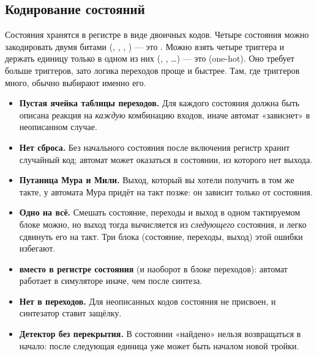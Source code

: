 \subsection{Кодирование состояний}

Состояния хранятся в регистре в виде двоичных кодов. Четыре состояния можно
закодировать двумя битами (, , , ) ---
это . Можно взять четыре триггера и держать единицу
только в одном из них (, , \ldots) --- это
 (one-hot). Оно требует больше триггеров, зато
логика переходов проще и быстрее. Там, где триггеров много, обычно выбирают
именно его. 

\begin{warnbox}
\begin{itemize}
  \item \textbf{Пустая ячейка таблицы переходов.} Для каждого состояния должна
        быть описана реакция на \emph{каждую} комбинацию входов, иначе
        автомат «зависнет» в неописанном случае.
  \item \textbf{Нет сброса.} Без начального состояния после включения
        регистр хранит случайный код; автомат может оказаться в состоянии, из
        которого нет выхода.
  \item \textbf{Путаница Мура и Мили.} Выход, который вы хотели получить в том
        же такте, у автомата Мура придёт на такт позже: он зависит только от
        состояния.
  \item \textbf{Одно  на всё.} Смешать состояние, переходы и
        выход в одном тактируемом блоке можно, но выход тогда вычисляется
        из \emph{следующего} состояния, и легко сдвинуть его на такт. Три
        блока (состояние, переходы, выход) этой ошибки избегают.
  \item \textbf{\code{=} вместо \code{<=} в регистре состояния} (и
        наоборот в блоке переходов): автомат работает в симуляторе иначе, чем
        после синтеза.
  \item \textbf{Нет  в  переходов.} Для неописанных
        кодов состояния  не присвоен, и синтезатор ставит защёлку.
  \item \textbf{Детектор без перекрытия.} В состоянии «найдено» нельзя
        возвращаться в начало: после  следующая единица уже может
        быть началом новой тройки.
\end{itemize}
\end{warnbox}

